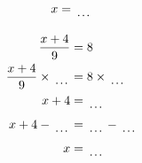 \documentclass[12pt]{article}
\newcounter{minipagecount}
\begin{document}
\begin{multicols}{2}
\begin{minipage}[t]{0.45\textwidth}
\begin{align*}
        x &= \dotuline{\hspace{5mm}}\\
    \end{align*}
\end{minipage} %
\noindent{(\theminipagecount)}\hspace{0.1mm} %
\begin{minipage}[t]{0.45\textwidth} %
    \vspace{-26pt}  %
    \raggedright %
    \begin{align*} %
        \frac{x + 4}{9} &= 8\\
        \frac{x + 4}{9} \times\dotuline{\hspace{5mm}} &= 8 \times\dotuline{\hspace{5mm}}\\
        x + 4 &= \dotuline{\hspace{5mm}}\\
        x + 4 - \dotuline{\hspace{5mm}} &= \dotuline{\hspace{5mm}} - \dotuline{\hspace{5mm}}\\
        x &= \dotuline{\hspace{5mm}}\\
    \end{align*}
\end{minipage} %
\noindent{(\theminipagecount)}\hspace{0.1mm} %
\begin{minipage}[t]{0.45\textwidth} %
    \vspace{-26pt}  %

\end{minipage}
\end{multicols}
\end{document}
